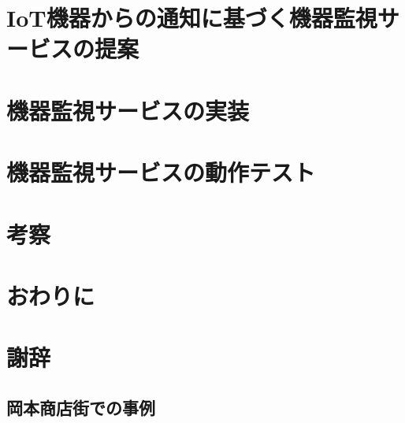 \documentclass[a4paper]{jreport}
\begin{document}
\chapter{IoT機器からの通知に基づく機器監視サービスの提案}

\chapter{機器監視サービスの実装}

\chapter{機器監視サービスの動作テスト}


\chapter{考察}


\chapter{おわりに}


\chapter{謝辞}





\appendix
\section{岡本商店街での事例}

%
\end{document}
